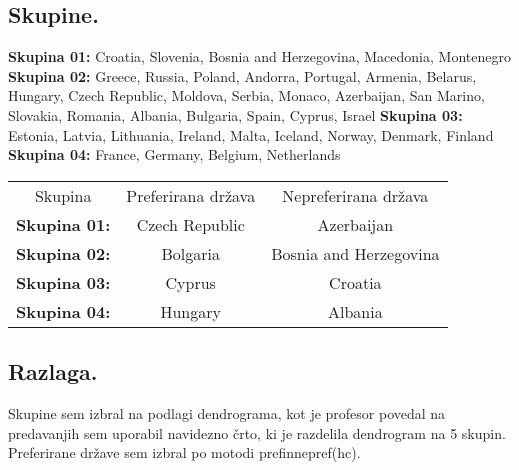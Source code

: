 \documentclass[11pt]{article}
\begin{document}
\subsection{Skupine.}
\textbf{Skupina 01:} Croatia, Slovenia, Bosnia and Herzegovina, Macedonia, Montenegro\\
\textbf{Skupina 02:} Greece, Russia, Poland, Andorra, Portugal, Armenia, Belarus, Hungary, Czech Republic, Moldova, Serbia, Monaco, Azerbaijan, San Marino, Slovakia, Romania, Albania, Bulgaria, Spain, Cyprus, Israel   
\textbf{Skupina 03:} Estonia, Latvia, Lithuania, Ireland, Malta, Iceland, Norway, Denmark, Finland \\
\textbf{Skupina 04:} France, Germany, Belgium, Netherlands

\begin{tabular}{ c c c }
 Skupina & Preferirana država & Nepreferirana država \\ 
 \textbf{Skupina 01:} & Czech Republic & Azerbaijan	 \\  
 \textbf{Skupina 02:} & Bolgaria & Bosnia and Herzegovina\\
 \textbf{Skupina 03:} & Cyprus & Croatia \\
 \textbf{Skupina 04:} & Hungary & Albania   
\end{tabular}

\subsection{Razlaga.}
Skupine sem izbral na podlagi dendrograma, kot je profesor povedal na predavanjih sem uporabil navidezno črto, ki je razdelila dendrogram na 5 skupin. Preferirane države sem izbral po motodi prefinnepref(hc).
\end{document}
